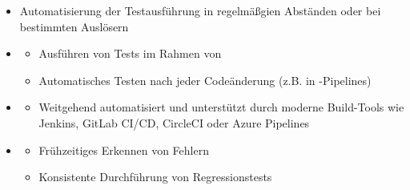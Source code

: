 \begin{infoBox}[title=Ausfürhren der Tests]
    \begin{itemize}
        \item {} Automatisierung der Testausführung in regelmäßgien Abständen oder bei bestimmten Auslösern
        \item {}
        \begin{itemize}
            \item Ausführen von Tests im Rahmen von 
            \item Automatisches Testen nach jeder Codeänderung (z.B. in -Pipelines)
        \end{itemize}
        \item {}
        \begin{itemize}
            \item Weitgehend automatisiert und unterstützt durch moderne Build-Tools wie Jenkins, GitLab CI/CD, CircleCI oder Azure Pipelines
        \end{itemize}
        \item {}
        \begin{itemize}
            \item Frühzeitiges Erkennen von Fehlern
            \item Konsistente Durchführung von Regressionstests
        \end{itemize}
    \end{itemize}
\end{infoBox}
